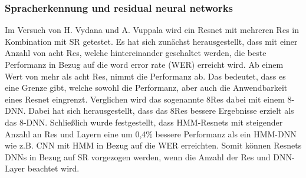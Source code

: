 \subsubsection{Spracherkennung und residual neural networks}
Im Versuch von H. Vydana und A. Vuppala \cite{residualnn} wird ein Resnet mit mehreren Res in Kombination mit SR getestet. Es hat sich zunächst herausgestellt, dass mit einer Anzahl von acht Res, welche hintereinander geschaltet werden, die beste Performanz in Bezug auf die word error rate (WER) erreicht wird. Ab einem Wert von mehr als acht Res, nimmt die Performanz ab. Das bedeutet, dass es eine Grenze gibt, welche sowohl die Performanz, aber auch die Anwendbarkeit eines Resnet eingrenzt. Verglichen wird das sogenannte 8Res dabei mit einem 8-DNN. Dabei hat sich herausgestellt, dass das 8Res bessere Ergebnisse erzielt als das 8-DNN. Schließlich wurde festgestellt, dass HMM-Resnets mit steigender Anzahl an Res und Layern eine um 0,4\% bessere Performanz als ein HMM-DNN \cite{residualnn} wie z.B. CNN mit HMM in Bezug auf die WER erreichten. Somit können Resnets DNNs in Bezug auf SR vorgezogen werden, wenn die Anzahl der Res und DNN-Layer beachtet wird.


